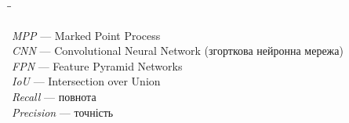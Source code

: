 \begin{tabbing}
    \hspace{0.8in}\=\hspace{1in}\=\kill

    \textit{MPP} \>--- Marked Point Process \\

    \textit{CNN} \>--- Convolutional Neural Network (згорткова нейронна мережа) \\

    \textit{FPN} \>--- Feature Pyramid Networks \\

    \textit{IoU} \>--- Intersection over Union \\

    \textit{Recall} \>--- повнота \\

    \textit{Precision} \>--- точність \\
\end{tabbing}